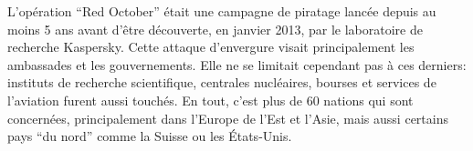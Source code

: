 \documentclass[article, french]{yReport}
\begin{document}
	L'opération \enquote{Red October} était une campagne de piratage lancée depuis au moins 5 ans avant d'être découverte, en janvier 2013, par le laboratoire de recherche Kaspersky.
	Cette attaque d'envergure visait principalement les ambassades et les gouvernements.
	Elle ne se limitait cependant pas à ces derniers: instituts de recherche scientifique, centrales nucléaires, bourses et services de l'aviation furent aussi touchés.
	En tout, c'est plus de 60 nations qui sont concernées, principalement dans l'Europe de l'Est et l'Asie, mais aussi certains pays \enquote{du nord} comme la Suisse ou les États-Unis.
	
\end{document}
